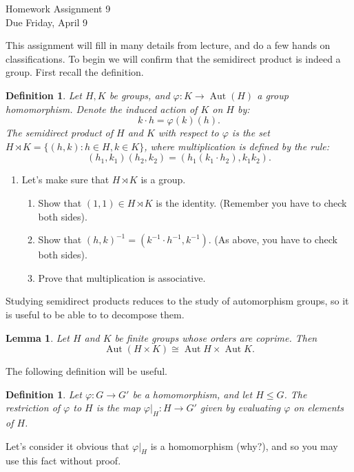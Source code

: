 \documentclass[11pt]{article}
\newtheorem{lemma}[theorem]{Lemma}
\newtheorem{definition}[theorem]{Definition}
\newcommand{\Aut}{\operatorname{Aut}}
\begin{document}
\begin{center}
  \Large {Homework Assignment 9}\\
  \small {Due Friday, April 9}
\end{center}
This assignment will fill in many details from lecture, and do a few hands on classifications.  To begin we will confirm that the semidirect product is indeed a group.  First recall the definition.
\begin{definition}
  Let $H,K$ be groups, and $\varphi:K\to\Aut(H)$ a group homomorphism.  Denote the induced action of $K$ on $H$ by:
  \[k\cdot h = \varphi(k)(h).\]
  The \textit{semidirect product} of $H$ and $K$ with respect to $\varphi$ is the set $H\rtimes K = \{(h,k):h\in H,k\in K\}$, where multiplication is defined by the rule:
  \[(h_1,k_1)(h_2,k_2) = (h_1(k_1\cdot h_2),k_1k_2).\]
\end{definition}
\begin{enumerate}
  \item{
  Let's make sure that $H\rtimes K$ is a group.
  \begin{enumerate}
    \item Show that $(1,1)\in H\rtimes K$ is the identity.  (Remember you have to check both sides).
    \item Show that $(h,k)^{-1} = (k^{-1}\cdot h^{-1},k^{-1})$. (As above, you have to check both sides).
    \item Prove that multiplication is associative.
  \end{enumerate}
  }
\end{enumerate}
Studying semidirect products reduces to the study of automorphism groups, so it is useful to be able to to decompose them.
\begin{lemma}\label{autDecomp}
  Let $H$ and $K$ be finite groups whose orders are coprime.  Then \[\Aut(H\times K)\cong\Aut H\times \Aut K.\]
\end{lemma}
The following definition will be useful.
\begin{definition}
  Let $\varphi:G\to G'$ be a homomorphism, and let $H\le G$.  The \textit{restriction of} $\varphi$ \textit{to }$H$ is the map $\varphi|_H:H\to G'$ given by evaluating $\varphi$ on elements of $H$.
\end{definition}
Let's consider it obvious that $\varphi|_H$ is a homomorphism (why?), and so you may use this fact without proof.
\end{document}
